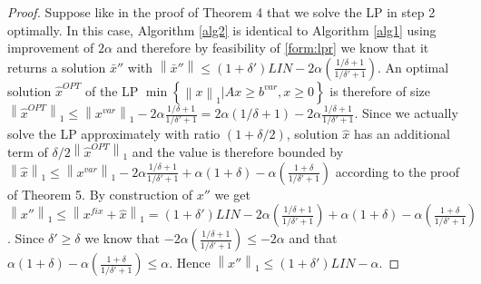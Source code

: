 \documentclass[a4paper,11pt]{article}
\newcommand{\mengest}[2]{\left\{#1|#2\right\}}
\newcommand{\nor}[1]{\left\|#1\right\|}
\begin{document}
\begin{proof}
	Suppose like in the proof of Theorem 4 that we solve the LP in step 2 optimally. In this case, Algorithm \ref{alg2} is 
	identical to Algorithm \ref{alg1} using improvement
	of $2 \alpha$ and therefore by feasibility of \ref{form:lpr} we know that it returns a solution $\bar{x}''$
	with 
	$\nor{\bar{x}''} \leq (1+ \delta') \mathit{LIN} - 2\alpha(\frac{1/ \delta +1}{1/ \delta'+1})$.
	An optimal solution $\hat{x}^{\mathit{OPT}}$ of the LP
	$\min \mengest{\nor{x}_1}{Ax \geq b^{var}, x \geq 0 }$ is therefore of size $\nor{\hat{x}^{\mathit{OPT}}}_1
	\leq \nor{x^{var}}_1 - 2\alpha \frac{1/\delta+1}{1/\delta'+1} = 2 \alpha(1/ \delta +1) -
	2\alpha \frac{1/\delta+1}{1/\delta'+1}$. Since we actually solve the LP approximately with ratio $(1+\delta / 2)$, 
	solution $\hat{x}$ has an additional term of $\delta / 2 \nor{\hat{x}^{\mathit{OPT}}}_1$ and the value is therefore 
	bounded by
	$\nor{\hat{x}}_1 \leq \nor{x^{var}}_1 - 2\alpha \frac{1/\delta+1}{1/\delta'+1} + 
	\alpha(1+ \delta) - \alpha (\frac{1+ \delta}{1/ \delta'+1})$ according to the proof of Theorem 5.
	By construction of $x''$ we get $\nor{x''}_1 \leq \nor{x^{fix} + \hat{x}}_1 = 
(1+ \delta') \mathit{LIN} -2 \alpha (\frac{1/ \delta +1}{1/ \delta'+1}) + \alpha(1+ \delta) 
       - \alpha (\frac{1+ \delta}{1/ \delta'+1})$. Since $\delta' \geq \delta$ we know that
       $-2 \alpha (\frac{1/ \delta +1}{1/ \delta'+1}) \leq -2 \alpha$ and that $\alpha(1+ \delta) 
       - \alpha (\frac{1+ \delta}{1/ \delta'+1}) \leq \alpha$. Hence $\nor{x''}_1 \leq  
       (1+ \delta')\mathit{LIN} - \alpha$.
\end{proof}
\end{document}
